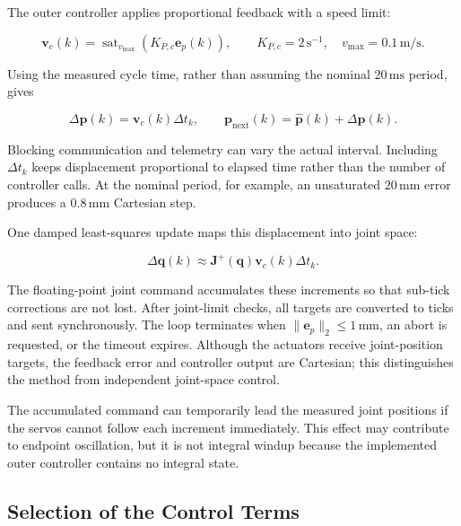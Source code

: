 The outer controller applies proportional feedback with a speed limit:

\begin{equation}
    \mathbf{v}_{c}(k)
    =
    \operatorname{sat}_{v_{\max}}
    \left(K_{P,c}\mathbf{e}_{p}(k)\right),
    \qquad
    K_{P,c}=2\,\mathrm{s}^{-1},
    \quad
    v_{\max}=0.1\,\mathrm{m/s}.
    \label{eq:cartesian_p_velocity}
\end{equation}

Using the measured cycle time, rather than assuming the nominal
\(20\,\mathrm{ms}\) period, gives

\begin{equation}
    \Delta\mathbf{p}(k)=\mathbf{v}_{c}(k)\Delta t_k,
    \qquad
    \mathbf{p}_{\mathrm{next}}(k)
    =
    \hat{\mathbf{p}}(k)+\Delta\mathbf{p}(k).
    \label{eq:resolved_rate_cartesian_step}
\end{equation}

Blocking communication and telemetry can vary the actual interval. Including
\(\Delta t_k\) keeps displacement proportional to elapsed time rather than the
number of controller calls. At the nominal period, for example, an unsaturated
\(20\,\mathrm{mm}\) error produces a \(0.8\,\mathrm{mm}\) Cartesian step.

One damped least-squares update maps this displacement into joint space:

\begin{equation}
    \Delta\mathbf{q}(k)
    \approx
    \mathbf{J}^{+}(\mathbf{q})\mathbf{v}_{c}(k)\Delta t_k.
    \label{eq:resolved_rate_joint_step}
\end{equation}

The floating-point joint command accumulates these increments so that sub-tick
corrections are not lost. After joint-limit checks, all targets are converted
to ticks and sent synchronously. The loop terminates when
\(\lVert\mathbf{e}_{p}\rVert_2\leq1\,\mathrm{mm}\), an abort is requested, or
the timeout expires. Although the actuators receive joint-position targets,
the feedback error and controller output are Cartesian; this distinguishes the
method from independent joint-space control.

The accumulated command can temporarily lead the measured joint positions if
the servos cannot follow each increment immediately. This effect may contribute
to endpoint oscillation, but it is not integral windup because the implemented
outer controller contains no integral state.

\subsection{Selection of the Control Terms}

